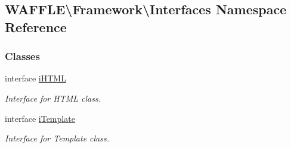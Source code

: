 \hypertarget{namespace_w_a_f_f_l_e_1_1_framework_1_1_interfaces}{}\subsection{W\+A\+F\+F\+LE\textbackslash{}Framework\textbackslash{}Interfaces Namespace Reference}
\label{namespace_w_a_f_f_l_e_1_1_framework_1_1_interfaces}
\subsubsection*{Classes}
\begin{DoxyCompactItemize}
\item 
interface \hyperlink{interface_w_a_f_f_l_e_1_1_framework_1_1_interfaces_1_1i_h_t_m_l}{i\+H\+T\+ML}
\begin{DoxyCompactList}\small\item\em Interface for H\+T\+ML class. \end{DoxyCompactList}\item 
interface \hyperlink{interface_w_a_f_f_l_e_1_1_framework_1_1_interfaces_1_1i_template}{i\+Template}
\begin{DoxyCompactList}\small\item\em Interface for Template class. \end{DoxyCompactList}\end{DoxyCompactItemize}
